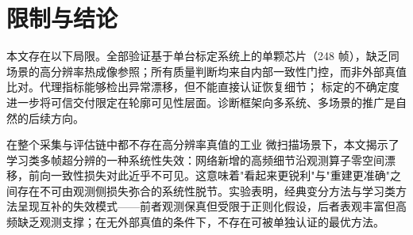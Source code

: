 \section{限制与结论}

本文存在以下局限。全部验证基于单台标定系统上的单颗芯片（248 帧），缺乏同场景的高分辨率热成像参照；所有质量判断均来自内部一致性门控，而非外部真值比对。代理指标能够检出异常漂移，但不能直接认证恢复细节； 标定的不确定度进一步将可信交付限定在轮廓可见性层面。诊断框架向多系统、多场景的推广是自然的后续方向。

在整个采集与评估链中都不存在高分辨率真值的工业  微扫描场景下，本文揭示了学习类多帧超分辨的一种系统性失效：网络新增的高频细节沿观测算子零空间漂移，前向一致性损失对此近乎不可见。这意味着"看起来更锐利"与"重建更准确"之间存在不可由观测侧损失弥合的系统性脱节。实验表明，经典变分方法与学习类方法呈现互补的失效模式——前者观测保真但受限于正则化假设，后者表观丰富但高频缺乏观测支撑；在无外部真值的条件下，不存在可被单独认证的最优方法。
